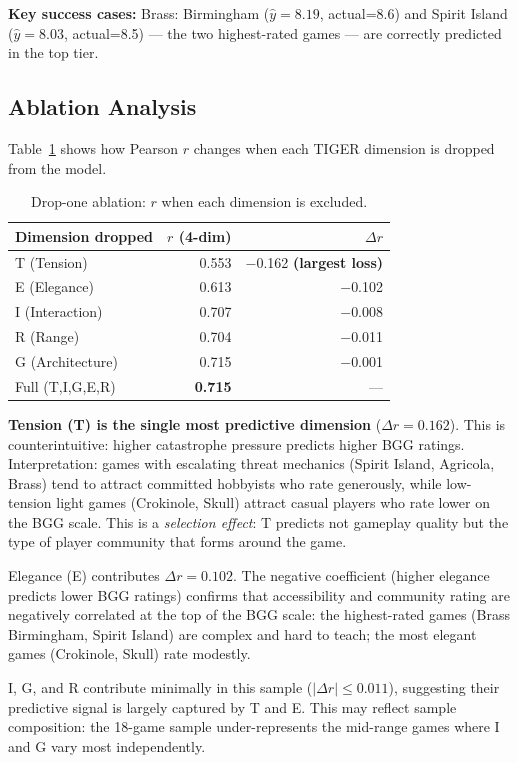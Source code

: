 \textbf{Key success cases:} Brass: Birmingham ($\hat{y}=8.19$, actual=8.6) and
Spirit Island ($\hat{y}=8.03$, actual=8.5) --- the two highest-rated games ---
are correctly predicted in the top tier.

\subsection{Ablation Analysis}

Table~\ref{tab:ablation} shows how Pearson $r$ changes when each TIGER dimension
is dropped from the model.

\begin{table}[ht]
\centering
\caption{Drop-one ablation: $r$ when each dimension is excluded.}
\label{tab:ablation}
\begin{tabular}{lrr}
\toprule
\textbf{Dimension dropped} & \textbf{$r$ (4-dim)} & \textbf{$\Delta r$} \\
\midrule
T (Tension)     & 0.553 & $-$0.162 \hspace{2pt}\textbf{(largest loss)} \\
E (Elegance)    & 0.613 & $-$0.102 \\
I (Interaction) & 0.707 & $-$0.008 \\
R (Range)       & 0.704 & $-$0.011 \\
G (Architecture)& 0.715 & $-$0.001 \\
\midrule
Full (T,I,G,E,R) & \textbf{0.715} & --- \\
\bottomrule
\end{tabular}
\end{table}

\textbf{Tension (T) is the single most predictive dimension} ($\Delta r = 0.162$).
This is counterintuitive: higher catastrophe pressure predicts higher BGG ratings.
Interpretation: games with escalating threat mechanics (Spirit Island, Agricola, Brass)
tend to attract committed hobbyists who rate generously, while low-tension light games
(Crokinole, Skull) attract casual players who rate lower on the BGG scale.
This is a \emph{selection effect}: T predicts not gameplay quality but the type of
player community that forms around the game.

Elegance (E) contributes $\Delta r = 0.102$.
The negative coefficient (higher elegance predicts lower BGG ratings)
confirms that accessibility and community rating are negatively correlated at the top
of the BGG scale: the highest-rated games (Brass Birmingham, Spirit Island) are complex
and hard to teach; the most elegant games (Crokinole, Skull) rate modestly.

I, G, and R contribute minimally in this sample ($|\Delta r| \leq 0.011$),
suggesting their predictive signal is largely captured by T and E.
This may reflect sample composition: the 18-game sample under-represents the
mid-range games where I and G vary most independently.
